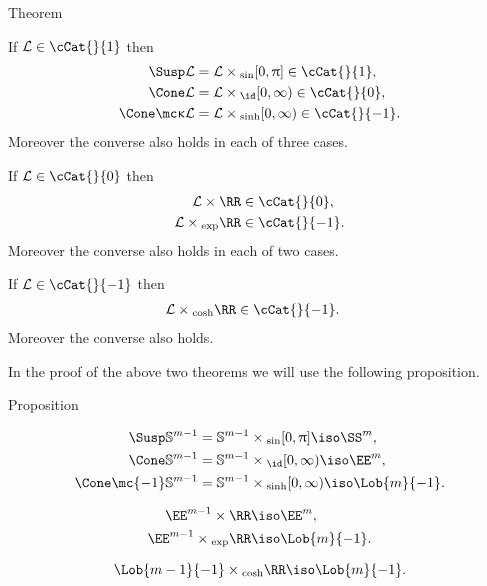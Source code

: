 \begin{thm}{Theorem}\label{thm:warp-curv-bound:cbb}
\begin{subthm}{}
If $\spc{L}\in\cCat{}{1}$
then 
\begin{align*}
\Susp\spc{L}&=\spc{L}\times_{\sin}[0,\pi]\in \cCat{}{1},
\\
\Cone\spc{L}&=\spc{L}\times_{\id}[0,\infty)\in \cCat{}{0},
\\
\Cone\mc\kappa\spc{L}&=\spc{L}\times_{\sinh}[0,\infty)\in \cCat{}{-1}.
\end{align*}
Moreover the converse also holds in each of three cases.
\end{subthm}

\begin{subthm}{}
If $\spc{L}\in\cCat{}{0}$
then 
\begin{align*}
\spc{L}\times\RR&\in\cCat{}{0},
\\
\spc{L}\times_{\exp}\RR&\in\cCat{}{-1}.
\end{align*}
Moreover the converse also holds in each of two cases.
\end{subthm}

\begin{subthm}{}
If $\spc{L}\in\cCat{}{-1}$
then 
\begin{align*}
\spc{L}\times_{\cosh}\RR&\in\cCat{}{-1}.
\end{align*}
Moreover the converse also holds.
\end{subthm}
\end{thm}

In the proof of the above two theorems
we will use the following proposition.

\begin{thm}{Proposition}\label{prop:warp-examples}

\begin{subthm}{}
\begin{align*}
\Susp\mathbb S^{m-1}&=\mathbb S^{m-1}\times_{\sin}[0,\pi]\iso\SS^m,
\\
\Cone\mathbb S^{m-1}&=\mathbb S^{m-1}\times_{\id}[0,\infty)\iso\EE^m,
\\
\Cone\mc{-1}\mathbb S^{m-1}&=\mathbb S^{m-1}\times_{\sinh}[0,\infty)\iso\Lob{m}{-1}.
\end{align*}
\end{subthm}



\begin{subthm}{}
\begin{align*}
\EE^{m-1}\times\RR&\iso\EE^{m},
\\
\EE^{m-1}\times_{\exp}\RR&\iso\Lob{m}{-1}.
\end{align*}
\end{subthm}

\begin{subthm}{}
\[\Lob{m-1}{-1}\times_{\cosh}\RR\iso\Lob{m}{-1}.\]
\end{subthm}

\end{thm}

